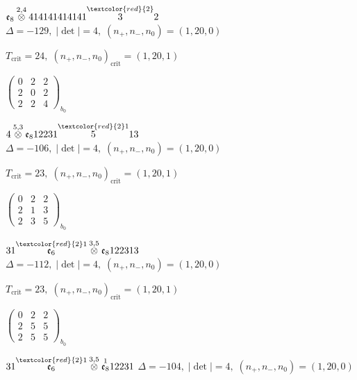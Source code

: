 \documentclass[10pt]{article}
\begin{document}
$\mathfrak{e}_8\overset{2,4}{\otimes}414141414141\overset{\textcolor{red}{2}}{3}2$ \quad $\Delta=-129,\; |\det|=4,\; (n_+,n_-,n_0)=(1,20,0)$

\hspace{1em}$T_{\text{crit}}=24,\; (n_+,n_-,n_0)_{\text{crit}}=(1,20,1)$

\hspace{2em}$\left(\begin{smallmatrix}0 & 2 & 2 \\ 2 & 0 & 2 \\ 2 & 2 & 4\end{smallmatrix}\right)_{\!b_0}$

\smallskip

$4\overset{5,3}{\otimes}\mathfrak{e}_812231\overset{\textcolor{red}{2}1}{5}13$ \quad $\Delta=-106,\; |\det|=4,\; (n_+,n_-,n_0)=(1,20,0)$

\hspace{1em}$T_{\text{crit}}=23,\; (n_+,n_-,n_0)_{\text{crit}}=(1,20,1)$

\hspace{2em}$\left(\begin{smallmatrix}0 & 2 & 2 \\ 2 & 1 & 3 \\ 2 & 3 & 5\end{smallmatrix}\right)_{\!b_0}$

\smallskip

$31\overset{\textcolor{red}{2}1}{\mathfrak{e}_6}\overset{3,5}{\otimes}\mathfrak{e}_8122313$ \quad $\Delta=-112,\; |\det|=4,\; (n_+,n_-,n_0)=(1,20,0)$

\hspace{1em}$T_{\text{crit}}=23,\; (n_+,n_-,n_0)_{\text{crit}}=(1,20,1)$

\hspace{2em}$\left(\begin{smallmatrix}0 & 2 & 2 \\ 2 & 5 & 5 \\ 2 & 5 & 5\end{smallmatrix}\right)_{\!b_0}$

\smallskip

$31\overset{\textcolor{red}{2}1}{\mathfrak{e}_6}\overset{3,5}{\otimes}\overset{1}{\mathfrak{e}_8}12231$ \quad $\Delta=-104,\; |\det|=4,\; (n_+,n_-,n_0)=(1,20,0)$
\end{document}
